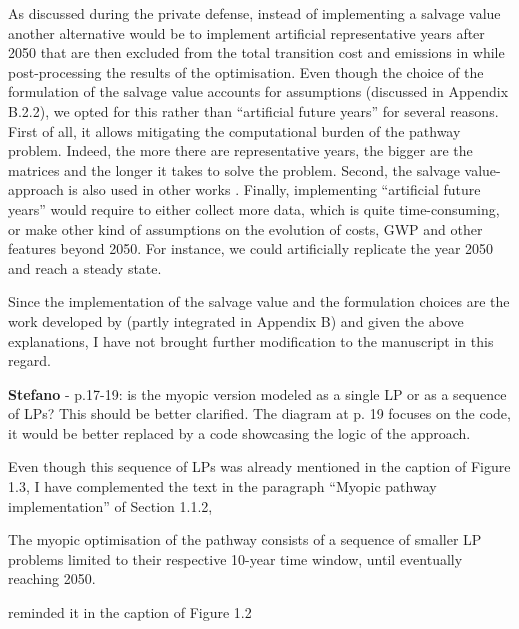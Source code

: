 \documentclass[12pt,a4paper]{article}
\begin{document}
As discussed during the private defense, instead of implementing a salvage value another alternative would be to implement artificial representative years after 2050 that are then excluded from the total transition cost and emissions in while post-processing the results of the optimisation. Even though the choice of the formulation of the salvage value accounts for assumptions (discussed in Appendix B.2.2), we opted for this rather than ``artificial future years'' for several reasons. First of all, it allows mitigating the computational burden of the pathway problem. Indeed, the more there are representative years, the bigger are the matrices and the longer it takes to solve the problem. Second, the salvage value-approach is also used in other works \cite{poncelet2016myopic,prina2019transition}. Finally, implementing ``artificial  future years'' would require to either collect more data, which is quite time-consuming, or make other kind of assumptions on the evolution of costs, GWP and other features beyond 2050. For instance, we could artificially replicate the year 2050 and reach a steady state.

Since the implementation of the salvage value and the formulation choices are the work developed by \citet{limpens2024pathway} (partly integrated in Appendix B) and given the above explanations, I have not brought further modification to the manuscript in this regard.

\begin{mdframed}[style=comment] %
{\color{orange} \textbf{Stefano}} - p.17-19: is the myopic version modeled as a single LP or as a sequence of LPs? This should be better clarified. The diagram at p. 19 focuses on the code, it would be better replaced by a code showcasing the logic of the approach.
\end{mdframed}

\noindent Even though this sequence of LPs was already mentioned {\color{blue}in the caption of Figure 1.3}, I have complemented the text {\color{blue} in the paragraph ``Myopic pathway implementation'' of Section 1.1.2}, 

\begin{mdframed}[style=manuscript] %
[...] The myopic optimisation of the pathway consists of a sequence of smaller LP problems limited to their respective 10-year time window, until eventually reaching 2050.
\end{mdframed}

\noindent reminded it in the caption of Figure 1.2
\end{document}
